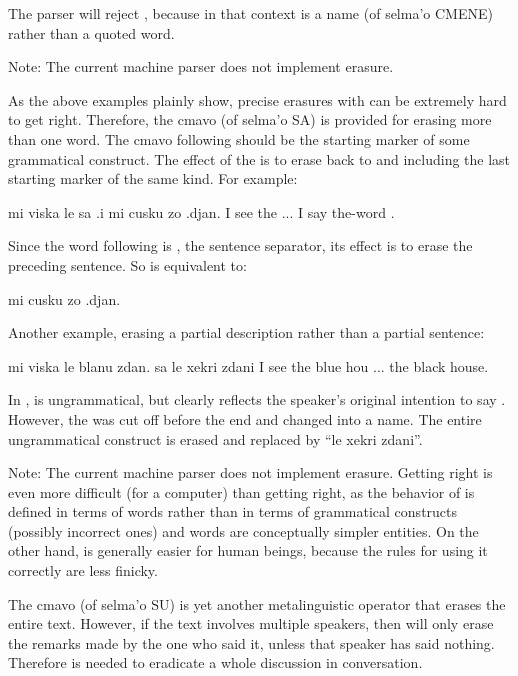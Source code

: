 The parser will reject , because in
    that context  is a name (of selma'o CMENE) rather
    than a quoted word.

Note: The current machine parser does not implement 
    erasure.

As the above examples plainly show, precise erasures with
     can be extremely hard to get right. Therefore, the cmavo
     (of selma'o SA) is provided for erasing more than one
    word. The cmavo following  should be the starting marker
    of some grammatical construct. The effect of the  is to
    erase back to and including the last starting marker of the
    same kind. For example:
\begin{example}
mi viska le sa .i mi cusku zo .djan.\n
I see the  ...  I say the-word .
\end{example}

Since the word following  is , the sentence
    separator, its effect is to erase the preceding sentence. So  is equivalent to:
\begin{example}
mi cusku zo .djan.
\end{example}

Another example, erasing a partial description rather than a
    partial sentence:
\begin{example}
mi viska le blanu zdan. sa le xekri zdani\n
I see the blue hou ...  the black house.
\end{example}

In ,  is
    ungrammatical, but clearly reflects the speaker's original
    intention to say . However, the  was
    cut off before the end and changed into a name. The entire
    ungrammatical  construct is erased and replaced by ``le
    xekri zdani''.

Note: The current machine parser does not implement 
    erasure. Getting  right is even more difficult (for a
    computer) than getting  right, as the behavior of 
    is defined in terms of words rather than in terms of
    grammatical constructs (possibly incorrect ones) and words are
    conceptually simpler entities. On the other hand,  is
    generally easier for human beings, because the rules for using
    it correctly are less finicky.

The cmavo  (of selma'o SU) is yet another
    metalinguistic operator that erases the entire text. However,
    if the text involves multiple speakers, then  will only
    erase the remarks made by the one who said it, unless that
    speaker has said nothing. Therefore  is needed to
    eradicate a whole discussion in conversation.

